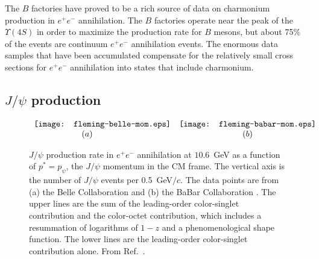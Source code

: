 The $B$ factories have proved to be a rich source of data on charmonium
production in $e^+ e^-$ annihilation. The $B$ factories operate near the
peak of the $\Upsilon(4S)$ in order to maximize the production rate for
$B$ mesons, but about 75\% of the events are continuum $e^+e^-$
annihilation events. The enormous data samples that have been accumulated
compensate for the relatively small cross sections for 
$e^+ e^-$ annihilation into states that include charmonium.

\subsection{$J/\psi$ production}

\begin{figure}
\begin{center}
$ \begin{array}{cc}
\texttt{[image: fleming-belle-mom.eps]}
&
\texttt{[image: fleming-babar-mom.eps]} \\
{\mathrm (a)} \hspace{.5in} & {\mathrm (b)}
\end{array} $
\caption{$J/\psi$ production rate in $e^+e^-$ annihilation at
$10.6$~GeV as a function of $p^* = p_{\psi}$, the $J/\psi$ momentum in
the CM frame. The vertical axis is the number of $J/\psi$ events per
0.5~GeV$/c$. The data points are from (a) the Belle Collaboration
\cite{Abe:2001za} and (b) the BaBar Collaboration
\cite{Aubert:2001pd}. The upper lines are the sum of the leading-order
color-singlet contribution and the color-octet contribution, which
includes a resummation of logarithms of $1-z$ and a phenomenological
shape function. The lower lines are the leading-order color-singlet
contribution alone. From Ref.~\cite{Fleming:2003gt}.}
\label{belle-babar}
\end{center}
\end{figure}

